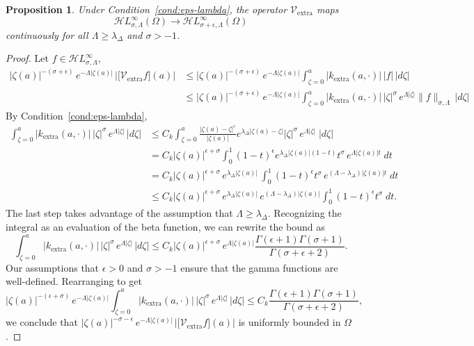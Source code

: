 \documentclass{article}
\theoremstyle{plain}
\newtheorem{prop}{Proposition}
\newcommand{\singexp}[2]{\mathcal{H}L^\infty_{#1, #2}}
\newcommand{\softpart}{\mathcal{V}_\text{extra}}
\newcommand{\domain}{\Omega}
\begin{document}
\begin{prop}\label{prop:smoothing}
Under {\em Condition~\eqref{cond:eps-lambda}}, the operator $\softpart$ maps
\[ \singexp{\sigma}{\Lambda}(\Omega) \to \singexp{\sigma+\epsilon}{\Lambda}(\Omega) \]
continuously for all $\Lambda\geq \lambda_{\Delta}$ and $\sigma>-1$.
\end{prop}

\begin{proof}
    Let $f\in\singexp{\sigma}{\Lambda}$,
    \begin{align*}
        |\zeta(a)|^{-(\sigma+\epsilon)} \, e^{-\Lambda |\zeta(a)|} \, \Big \vert \big[ \softpart f\big](a)\Big\vert
        &\leq |\zeta(a)|^{-(\sigma+\epsilon)}\, e^{-\Lambda |\zeta(a)|} \int_{\zeta=0}^a |k_\text{extra}(a,\cdot)|\, |f| \, |d\zeta| \\
        &\leq |\zeta(a)|^{-(\sigma+\epsilon)}\, e^{-\Lambda |\zeta(a)|} \int_{\zeta=0}^a |k_\text{extra}(a,\cdot)|\, |\zeta|^{\sigma}\, e^{\Lambda |\zeta|} \|f\|_{\sigma,\Lambda} \, |d\zeta| 
    \end{align*}
    By Condition~\eqref{cond:eps-lambda},
    \begin{align*}
         \int_{\zeta=0}^a |k_\text{extra}(a,\cdot)|\, |\zeta|^{\sigma}\, e^{\Lambda |\zeta|} \, |d\zeta| &\leq C_k \int_{\zeta=0}^a \frac{|\zeta(a)-\zeta|^\epsilon}{|\zeta(a)|} e^{\lambda_\Delta |\zeta(a)-\zeta|} |\zeta|^{\sigma}\, e^{\Lambda|\zeta|}\;|d\zeta|\\
         &=C_k |\zeta(a)|^{\epsilon+\sigma} \int_{0}^1 (1-t)^\epsilon e^{\lambda_\Delta |\zeta(a)|(1-t)} t^{\sigma}\, e^{\Lambda|\zeta(a)| t}\;dt\\
         &=C_k |\zeta(a)|^{\epsilon+\sigma}\, e^{\lambda_\Delta |\zeta(a)|}\,  \int_{0}^1 (1-t)^\epsilon  t^{\sigma}\,e^{(\Lambda-\lambda_\Delta)|\zeta(a)| t}\;dt\\
         &\le C_k |\zeta(a)|^{\epsilon+\sigma}\, e^{\lambda_\Delta |\zeta(a)|}\,e^{(\Lambda-\lambda_\Delta)|\zeta(a)|}\int_{0}^1 (1-t)^\epsilon  t^{\sigma}\;dt.
    \end{align*}
    The last step takes advantage of the assumption that $\Lambda \ge \lambda_\Delta$. Recognizing the integral as an evaluation of the beta function, we can rewrite the bound as
    \[ \int_{\zeta=0}^a |k_\text{extra}(a,\cdot)|\, |\zeta|^{\sigma}\, e^{\Lambda |\zeta|} \, |d\zeta| \le C_k |\zeta(a)|^{\epsilon+\sigma}\, e^{\Lambda |\zeta(a)|} \frac{\Gamma(\epsilon+1)\Gamma(\sigma+1)}{\Gamma(\sigma+\epsilon+2)}. \]
    Our assumptions that $\epsilon > 0$ and $\sigma > -1$ ensure that the gamma functions are well-defined. Rearranging to get
    \[ |\zeta(a)|^{-(\epsilon+\sigma)}\, e^{-\Lambda |\zeta(a)|} \int_{\zeta=0}^a |k_\text{extra}(a,\cdot)|\, |\zeta|^{\sigma}\, e^{\Lambda |\zeta|} \, |d\zeta| \le C_k \frac{\Gamma(\epsilon+1)\Gamma(\sigma+1)}{\Gamma(\sigma+\epsilon+2)}, \]
    we conclude that $|\zeta(a)|^{-\sigma-\epsilon} \, e^{-\Lambda |\zeta(a)|} \, \Big \vert \big[ \softpart f\big](a)\Big\vert$ is uniformly bounded in $\domain$. 
\end{proof}
\end{document}

